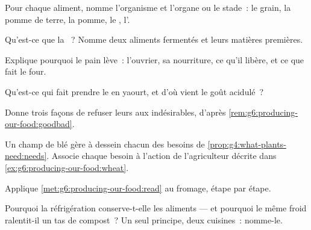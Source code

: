 \begin{exercise}[$\star$]\label{exo:g6:producing-our-food:2}
Pour chaque aliment, nomme l'organisme et l'organe ou le stade~: le
grain, la pomme de terre, la pomme, le , l'.
\end{exercise}

\begin{exercise}[$\star$]\label{exo:g6:producing-our-food:3}
Qu'est-ce que la ~? Nomme deux aliments fermentés et
leurs matières premières.
\end{exercise}

\begin{exercise}[$\star$]\label{exo:g6:producing-our-food:4}
Explique pourquoi le pain lève~: l'ouvrier, sa nourriture, ce qu'il
libère, et ce que fait le four.
\end{exercise}

\begin{exercise}[$\star$]\label{exo:g6:producing-our-food:5}
Qu'est-ce qui fait prendre le  en yaourt, et d'où vient le goût
acidulé~?
\end{exercise}

\begin{exercise}[$\star$]\label{exo:g6:producing-our-food:6}
Donne trois façons de refuser leurs  aux 
indésirables, d'après \cref{rem:g6:producing-our-food:goodbad}.
\end{exercise}

\begin{exercise}[$\star\star$]\label{exo:g6:producing-our-food:7}
Un champ de blé gère à dessein chacun des besoins de
\cref{prop:g4:what-plants-need:needs}. Associe chaque besoin à
l'action de l'agriculteur décrite dans
\cref{ex:g6:producing-our-food:wheat}.
\end{exercise}

\begin{exercise}[$\star\star$]\label{exo:g6:producing-our-food:8}
Applique \cref{met:g6:producing-our-food:read} au fromage, étape
par étape.
\end{exercise}

\begin{exercise}[$\star\star$]\label{exo:g6:producing-our-food:9}
Pourquoi la réfrigération conserve-t-elle les aliments --- et
pourquoi le même froid ralentit-il un tas de compost~? Un seul
principe, deux cuisines~: nomme-le.
\end{exercise}

